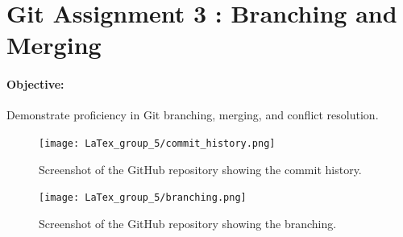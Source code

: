 \documentclass[12pt, a4paper]{article}
\begin{document}
\section*{\Huge{Git Assignment 3 : Branching and Merging}}

\paragraph{Objective:} Demonstrate proficiency in Git branching, merging, and conflict resolution.

\vspace{0.5cm}

\begin{figure}[h!]
    \centering
    \texttt{[image: LaTex\_group\_5/commit\_history.png]} %
     \hspace{4 cm}
    \caption{Screenshot of the GitHub repository showing the commit history.}
\end{figure}

\begin{figure}[h!]
    \centering
    \texttt{[image: LaTex\_group\_5/branching.png]} %
     \hspace{4 cm}
    \caption{Screenshot of the GitHub repository showing the branching.}
\end{figure}
\newpage
{}
\vspace{-1.5cm}
\end{document}
